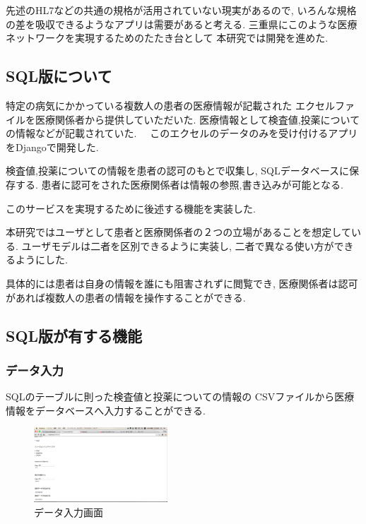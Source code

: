 先述のHL7などの共通の規格が活用されていない現実があるので,
いろんな規格の差を吸収できるようなアプリは需要があると考える.
三重県にこのような医療ネットワークを実現するためのたたき台として
本研究では開発を進めた.
\fi



\subsection{SQL版について}
  特定の病気にかかっている複数人の患者の医療情報が記載された
  エクセルファイルを医療関係者から提供していただいた.
  医療情報として検査値,投薬についての情報などが記載されていた.
　このエクセルのデータのみを受け付けるアプリをDjangoで開発した.

  検査値,投薬についての情報を患者の認可のもとで収集し,
  SQLデータベースに保存する.
  患者に認可をされた医療関係者は情報の参照,書き込みが可能となる.

  このサービスを実現するために後述する機能を実装した.

  本研究ではユーザとして患者と医療関係者の２つの立場があることを想定している.
  ユーザモデルは二者を区別できるように実装し,
  二者で異なる使い方ができるようにした.

  具体的には患者は自身の情報を誰にも阻害されずに閲覧でき,
  医療関係者は認可があれば複数人の患者の情報を操作することができる.



\subsection{SQL版が有する機能}
  \subsubsection{データ入力}
    SQLのテーブルに則った検査値と投薬についての情報の
    CSVファイルから医療情報をデータベースへ入力することができる.

    \begin{figure}[htbp]
  		\begin{center}
  			\includegraphics[width=5cm, bb=0 0 645 790]{./gazou/DjangoFileio.png} %
  		\end{center}
  		\caption{データ入力画面}
  		\label{DjangoFileio}
  	\end{figure}

